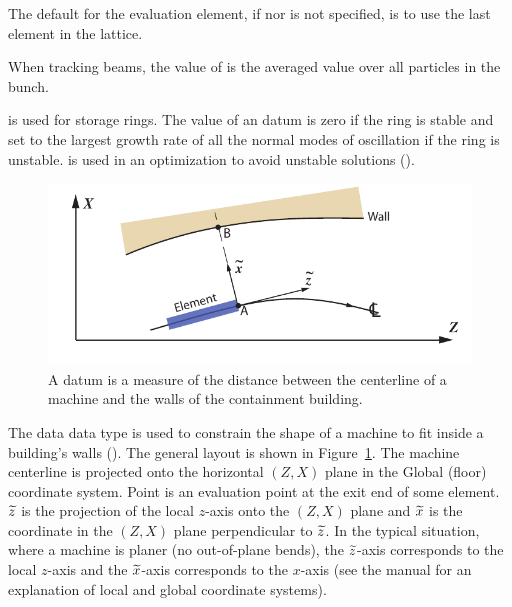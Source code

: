 \begin{description}
{The default for the evaluation element, if  nor
 is not specified, is to use the last element in the
lattice. 

When tracking beams, the value of  is the averaged
value over all particles in the bunch.

  \item[unstable.ring] \Newline
{} is used for storage rings. The value of an
 datum is zero if the ring is stable and set to the
largest growth rate of all the normal modes of oscillation if the ring
is unstable.  is used in an optimization to avoid
unstable solutions ().

\begin{figure}
  \centering
  \includegraphics[width=5in]{building-wall-constraint.pdf}
  \caption[Building wall datum]
{A  datum is a measure of the distance between the
centerline of a machine and the walls of the containment building.}
  \label{f:wall.constraint}
\end{figure}

  \item[wall.left_side, .right_side] \Newline
The  data data type is used to constrain the shape of a machine to fit
inside a building's walls (). The general layout is shown in
Figure~\ref{f:wall.constraint}. The machine centerline is projected onto the horizontal
$(Z, X)$ plane in the Global (floor) coordinate system. Point  is an evaluation
point at the exit end of some element. $\widetilde z$ is the projection of the local $z$-axis
onto the $(Z, X)$ plane and $\widetilde x$ is the coordinate in the $(Z, X)$ plane perpendicular
to $\widetilde z$. In the typical situation, where a machine is planer (no out-of-plane bends),
the $\widetilde z$-axis corresponds to the local $z$-axis and the $\widetilde x$-axis corresponds to the
$x$-axis (see the \bmad manual for an explanation of local and global coordinate systems).

}
\end{description}
